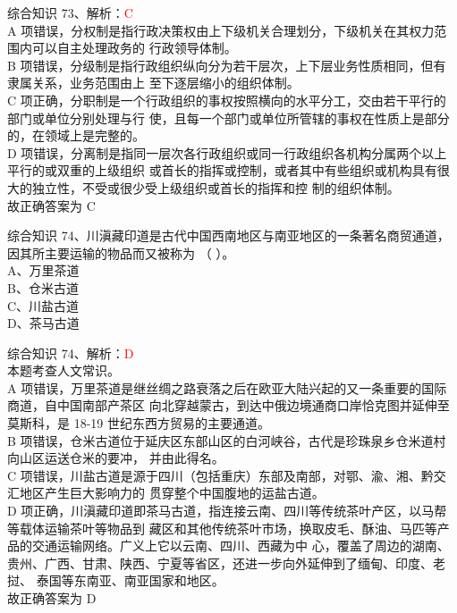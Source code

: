 \documentclass[aspectratio=169]{beamer}
\begin{document}
\begin{frame}[t]{综合知识}
    73、解析：\textcolor{red}{C}\\
    A 项错误，分权制是指行政决策权由上下级机关合理划分，下级机关在其权力范围内可以自主处理政务的
    行政领导体制。\\
    B 项错误，分级制是指行政组织纵向分为若干层次，上下层业务性质相同，但有隶属关系，业务范围由上
    至下逐层缩小的组织体制。\\
    C 项正确，分职制是一个行政组织的事权按照横向的水平分工，交由若干平行的部门或单位分别处理与行
    使，且每一个部门或单位所管辖的事权在性质上是部分的，在领域上是完整的。\\
    D 项错误，分离制是指同一层次各行政组织或同一行政组织各机构分属两个以上平行的或双重的上级组织
    或首长的指挥或控制，或者其中有些组织或机构具有很大的独立性，不受或很少受上级组织或首长的指挥和控
    制的组织体制。\\
    故正确答案为 C\\
\end{frame}                           






\begin{frame}[t]{综合知识}
    74、川滇藏印道是古代中国西南地区与南亚地区的一条著名商贸通道，因其所主要运输的物品而又被称为
    （ ）。          \\
    A、万里茶道      \\
    B、仓米古道      \\
    C、川盐古道      \\
    D、茶马古道      \\
\end{frame}                           

\begin{frame}[t]{综合知识}
    74、解析：\textcolor{red}{D}\\
    {\small
    本题考查人文常识。\\
    A 项错误，万里茶道是继丝绸之路衰落之后在欧亚大陆兴起的又一条重要的国际商道，自中国南部产茶区
    向北穿越蒙古，到达中俄边境通商口岸恰克图并延伸至莫斯科，是 18-19 世纪东西方贸易的主要通道。\\
    B 项错误，仓米古道位于延庆区东部山区的白河峡谷，古代是珍珠泉乡仓米道村向山区运送仓米的要冲，
    并由此得名。\\
    C 项错误，川盐古道是源于四川（包括重庆）东部及南部，对鄂、渝、湘、黔交汇地区产生巨大影响力的
    贯穿整个中国腹地的运盐古道。\\
    D 项正确，川滇藏印道即茶马古道，指连接云南、四川等传统茶叶产区，以马帮等载体运输茶叶等物品到
    藏区和其他传统茶叶市场，换取皮毛、酥油、马匹等产品的交通运输网络。广义上它以云南、四川、西藏为中
    心，覆盖了周边的湖南、贵州、广西、甘肃、陕西、宁夏等省区，还进一步向外延伸到了缅甸、印度、老挝、
    泰国等东南亚、南亚国家和地区。\\
    故正确答案为 D\\


    }
\end{frame}                           
\end{document}
